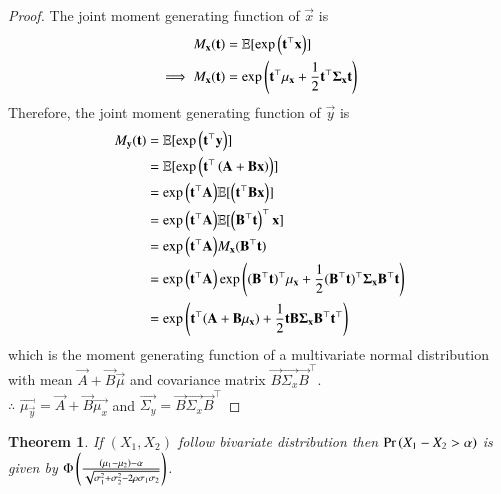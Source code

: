 \documentclass[journal,12pt,twocolumn]{IEEEtran}
\newtheorem{theorem}{Theorem}[section]
\begin{document}
\begin{proof}
    The joint moment generating function of $\vec{x}$ is
    \begin{align}
        M_{\mathbf{x}}(\mathbf{t})&=\mathbb{E}[\exp{\ensuremath{\left(\mathbf{t}^{\top}\mathbf{x}\right)}}]\\
        \implies M_{\mathbf{x}}(\mathbf{t})&=\exp{\ensuremath{\left(\mathbf{t}^{\top}\mathbf{\mu_x}+\frac{1}{2}\mathbf{t}^{\top}\mathbf{\Sigma_x}\mathbf{t}\right)}}
    \end{align}
    Therefore, the joint moment generating function of $\vec{y}$ is
    \begin{align}
        M_{\mathbf{y}}(\mathbf{t})&=\mathbb{E}[\exp{\ensuremath{\left(\mathbf{t}^{\top}\mathbf{y}\right)}}]\\
                            &=\mathbb{E}[\exp{\ensuremath{\left(\mathbf{t}^{\top}\left(\mathbf{A}+\mathbf{B}\mathbf{x}\right)\right)}}]\\ &=\exp{\ensuremath{\left(\mathbf{t}^{\top}\mathbf{A}\right)}}\mathbb{E}[\left(\mathbf{t}^{\top}{\mathbf{B}\mathbf{x}}\right)]\\ &=\exp{\ensuremath{\left(\mathbf{t}^{\top}\mathbf{A}\right)}}\mathbb{E}[\left(\mathbf{B}^{\top}\mathbf{t}\right)^{\top}\mathbf{x}]\\
                            &=\exp{\ensuremath{\left(\mathbf{t}^{\top}\mathbf{A}\right)}}M_{\mathbf{x}}(\mathbf{B}^{\top}\mathbf{t})\\
                            &=\exp{\ensuremath{\left(\mathbf{t}^{\top}\mathbf{A}\right)}}\exp{\ensuremath{\left((\mathbf{B}^{\top}\mathbf{t})^{\top}\mathbf{\mu_x}+\frac{1}{2}(\mathbf{B}^{\top}\mathbf{t})^{\top}\mathbf{\Sigma_x}\mathbf{B}^{\top}\mathbf{t}\right)}}\\
                            &=\exp\left(\mathbf{t}^{\top}(\mathbf{A}+\mathbf{B}\mathbf{\mu_x})+\frac{1}{2}\mathbf{t}\mathbf{B}\mathbf{\Sigma_x}\mathbf{B}^{\top}\mathbf{t}^{\top}\right)
    \end{align}
    which is the moment generating function of a multivariate normal distribution with mean $\vec{A}+\vec{B}\vec{\mu}$ and covariance matrix $\vec{B}\vec{\Sigma_x}\vec{B}^{\top}$.\\
    
    $\therefore$ $\vec{\mu_\vec{y}}=\vec{A}+\vec{B}\vec{\mu_x}$ and $\vec{\Sigma_y}=\vec{B}\vec{\Sigma_x}\vec{B}^{\top}$
\end{proof}
\begin{theorem}\label{1.1}
    If $(X_1,X_2)$ follow bivariate distribution then $\Pr\left(X_1-X_2>\alpha\right)$ is given by $\Phi\left(\frac{(\mu_1-\mu_2)-\alpha}{\sqrt{\sigma^2_1+\sigma^2_2-2\rho\sigma_1\sigma_2}}\right)$.
\end{theorem}
\end{document}
